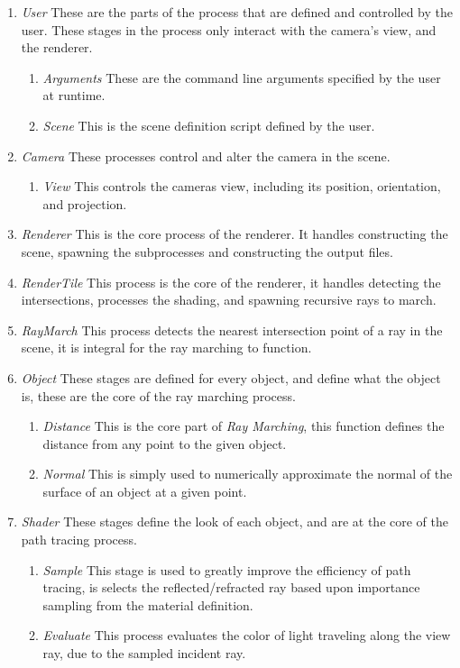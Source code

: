 \documentclass[../pbr.tex]{subfile}
\begin{document}
\begin{enumerate}
  \item \textit{User} These are the parts of the process that are defined and
    controlled by the user. These stages in the process only interact with the
    camera's view, and the renderer.
    \begin{enumerate}
      \item \textit{Arguments} These are the command line arguments specified by the
        user at runtime.
      \item \textit{Scene} This is the scene definition script defined by the user.
    \end{enumerate}
  \item \textit{Camera} These processes control and alter the camera in the
    scene.
    \begin{enumerate}
      \item \textit{View} This controls the cameras view, including its
        position, orientation, and projection.
    \end{enumerate}
  \item \textit{Renderer} This is the core process of the renderer. It handles
    constructing the scene, spawning the subprocesses and constructing the
    output files.
  \item \textit{RenderTile} This process is the core of the renderer, it
    handles detecting the intersections, processes the shading, and spawning
    recursive rays to march.
  \item \textit{RayMarch} This process detects the nearest intersection point
    of a ray in the scene, it is integral for the ray marching to function.
  \item \textit{Object} These stages are defined for every object, and define
    what the object is, these are the core of the ray marching process.
    \begin{enumerate}
      \item \textit{Distance} This is the core part of \textit{Ray Marching},
        this function defines the distance from any point to the given object.
      \item \textit{Normal} This is simply used to numerically approximate the
        normal of the surface of an object at a given point.
    \end{enumerate}
  \item \textit{Shader} These stages define the look of each object, and are at
    the core of the path tracing process.
    \begin{enumerate}
      \item \textit{Sample} This stage is used to greatly improve the
        efficiency of path tracing, is selects the reflected/refracted ray
        based upon importance sampling from the material definition.
      \item \textit{Evaluate} This process evaluates the color of light
        traveling along the view ray, due to the sampled incident ray.
    \end{enumerate}
\end{enumerate}
\end{document}
